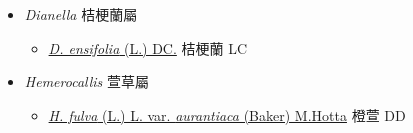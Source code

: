 
  \begin{itemize}
 \item[] \textit{Dianella} 桔梗蘭屬
                    
  \begin{itemize}
        \item[] \href{http://www.theplantlist.org/tpl1.1/search?q=Dianella+ensifolia}{\textit{D. ensifolia} (L.) DC.}   桔梗蘭 LC
  \end{itemize}
 \item[] \textit{Hemerocallis} 萱草屬
                    
  \begin{itemize}
        \item[] \href{http://www.theplantlist.org/tpl1.1/search?q=Hemerocallis+fulva+var.+aurantiaca}{\textit{H. fulva} (L.) L. var. \textit{aurantiaca} (Baker) M.Hotta}     橙萱 DD
  \end{itemize}
  \end{itemize}

